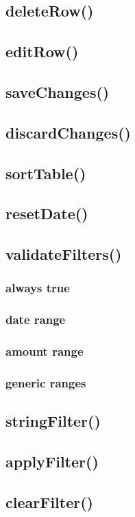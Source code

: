 \documentclass[letterpaper]{article}
\begin{document}
\subsection{deleteRow()}
\subsection{editRow()}
\subsection{saveChanges()}
\subsection{discardChanges()}
\subsection{sortTable()}
\subsection{resetDate()}
\subsection{validateFilters()}
\subsubsection{always true}
\subsubsection{date range}
\subsubsection{amount range}
\subsubsection{generic ranges}
\subsection{stringFilter()}
\subsection{applyFilter()}
\subsection{clearFilter()}
\end{document}
